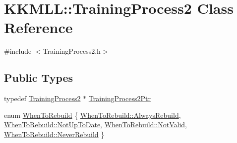 \hypertarget{class_k_k_m_l_l_1_1_training_process2}{}\section{K\+K\+M\+LL\+:\+:Training\+Process2 Class Reference}
\label{class_k_k_m_l_l_1_1_training_process2}


{\ttfamily \#include $<$Training\+Process2.\+h$>$}

\subsection*{Public Types}
\begin{DoxyCompactItemize}
\item 
typedef \hyperlink{class_k_k_m_l_l_1_1_training_process2}{Training\+Process2} $\ast$ \hyperlink{class_k_k_m_l_l_1_1_training_process2_a5442e76e1ae2de2e77e3a36b55f98fe4}{Training\+Process2\+Ptr}
\item 
enum \hyperlink{class_k_k_m_l_l_1_1_training_process2_acc48e76f6978c8c8c0c849eec2d0ee53}{When\+To\+Rebuild} \{ \hyperlink{class_k_k_m_l_l_1_1_training_process2_acc48e76f6978c8c8c0c849eec2d0ee53af19cc2f24e3b601e28ca877505de0d4b}{When\+To\+Rebuild\+::\+Always\+Rebuild}, 
\hyperlink{class_k_k_m_l_l_1_1_training_process2_acc48e76f6978c8c8c0c849eec2d0ee53aa9ee9e59b640e8a26608a00649252ef7}{When\+To\+Rebuild\+::\+Not\+Up\+To\+Date}, 
\hyperlink{class_k_k_m_l_l_1_1_training_process2_acc48e76f6978c8c8c0c849eec2d0ee53a04665ec171e86ef749cc563d7bdeec91}{When\+To\+Rebuild\+::\+Not\+Valid}, 
\hyperlink{class_k_k_m_l_l_1_1_training_process2_acc48e76f6978c8c8c0c849eec2d0ee53ad2a9e8494ea01fc1f0e1c8925eb94cd2}{When\+To\+Rebuild\+::\+Never\+Rebuild}
 \}
\end{DoxyCompactItemize}

